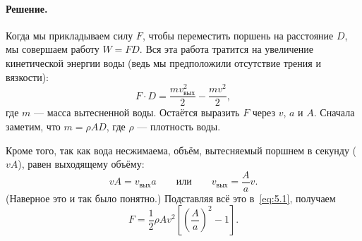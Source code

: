 \paragraph{Решение.}
Когда мы прикладываем силу $F$, чтобы переместить поршень на расстояние $D$, мы совершаем работу $W=F D$.
Вся эта работа тратится на увеличение кинетической энергии воды (ведь мы предположили отсутствие трения и вязкости):
\begin{equation}
F \cdot D=\frac{m v_{\text{вых}}^{2}}{2} - \frac{m v^{2}}{2},
\label{eq:5.1}
\end{equation}
где $m$ --- масса вытесненной воды.
Остаётся выразить $F$ через $v$, $a$ и $A$.
Сначала заметим, что $m=\rho A D$, где $\rho$ --- плотность воды.

Кроме того, так как вода несжимаема, объём, вытесняемый поршнем в секунду ($vA$), равен выходящему объёму:
\[
vA=v_{\text{вых}} a
\qquad\text{или}\qquad
v_{\text{вых}}=\frac{A}{a} v.
\]
(Наверное это и так было понятно.)
Подставляя всё это в~\eqref{eq:5.1}, получаем
\begin{equation}
F=\frac12\rho A v^{2} \left[ \left(\frac{A}{a}\right)^2  - 1 \right].
\label{eq:5.2}
\end{equation}

